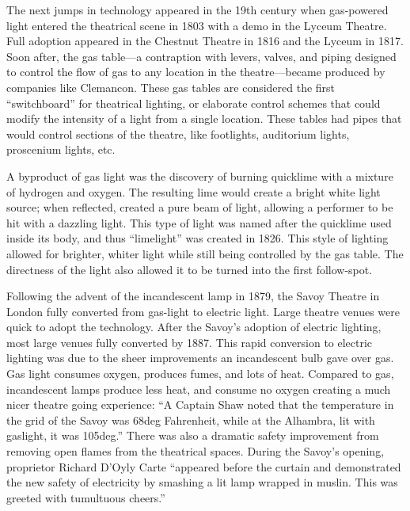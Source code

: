 \documentclass[
    12pt,
    twoside,
    bibstyle=chicago,
    headerstyle=uppercase,
	bibfile=thesis_updating.bib
]{reedthesis}
\begin{document}

The next jumps in technology appeared in the 19th century when gas-powered light entered the theatrical scene in 1803 with a demo in the Lyceum Theatre. Full adoption appeared in the Chestnut Theatre in 1816 and the Lyceum in 1817.  Soon after, the gas table---a contraption with levers, valves, and piping designed to control the flow of gas to any location in the theatre---became produced by companies like Clemancon. These gas tables are considered the first “switchboard” for theatrical lighting, or elaborate control schemes that could modify the intensity of a light from a single location. These tables had pipes that would control sections of the theatre, like footlights, auditorium lights, proscenium lights, etc. 

A byproduct of gas light was the discovery of burning quicklime with a mixture of hydrogen and oxygen. The resulting lime would create a bright white light source; when reflected, created a pure beam of light, allowing a performer to be hit with a dazzling light. This type of light was named after the quicklime used inside its body, and thus “limelight” was created in 1826. This style of lighting allowed for brighter, whiter light while still being controlled by the gas table. The directness of the light also allowed it to be turned into the first follow-spot.

Following the advent of the incandescent lamp in 1879, the Savoy Theatre in London fully converted from gas-light to electric light. Large theatre venues were quick to adopt the technology. After the Savoy’s adoption of electric lighting, most large venues fully converted by 1887. This rapid conversion to electric lighting was due to the sheer improvements an incandescent bulb gave over gas. Gas light consumes oxygen, produces fumes, and lots of heat. Compared to gas, incandescent lamps produce less heat, and consume no oxygen creating a much nicer theatre going experience: “A Captain Shaw noted that the temperature in the grid of the Savoy was 68deg Fahrenheit, while at the Alhambra, lit with gaslight, it was 105deg.” There was also a dramatic safety improvement from removing open flames from the theatrical spaces. During the Savoy’s opening, proprietor Richard D’Oyly Carte “appeared before the curtain and demonstrated the new safety of electricity by smashing a lit lamp wrapped in muslin. This was greeted with tumultuous cheers.”
\end{document}
